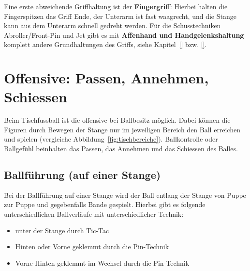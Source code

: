 Eine erste abweichende Griffhaltung ist der \textbf{Fingergriff}: Hierbei halten die Fingerspitzen das Griff Ende, der Unterarm ist fast waagrecht, und die Stange kann aus dem Unterarm schnell gedreht werden.
Für die Schusstechniken Abroller/Front-Pin und Jet gibt es mit \textbf{Affenhand und Handgelenkshaltung} komplett andere Grundhaltungen des Griffs, siehe Kapitel~\ref{} bzw. \ref{}.


\section{Offensive: Passen, Annehmen, Schiessen}
\label{technik:offensive}

Beim Tischfussball ist die \gls{offensive} bei Ballbesitz möglich.
Dabei können die Figuren durch Bewegen der Stange nur im jeweiligen Bereich den Ball erreichen und spielen (vergleiche Abbildung~\ref{fig:tischbereiche}).
Ballkontrolle oder Ballgefühl beinhalten das Passen, das Annehmen und das Schiessen des Balles.

\subsection{Ballführung (auf einer Stange)} 
\label{technik:offensive:eine}

Bei der Ballführung auf einer Stange wird der Ball entlang der Stange von Puppe zur Puppe und gegebenfalls Bande gespielt. Hierbei gibt es folgende unterschiedlichen Ballverläufe mit unterschiedlicher Technik:
\begin{itemize}
    \item unter der Stange durch Tic-Tac
    \item Hinten oder Vorne geklemmt durch die Pin-Technik
    \item Vorne-Hinten geklemmt im Wechsel durch die Pin-Technik
\end{itemize}

